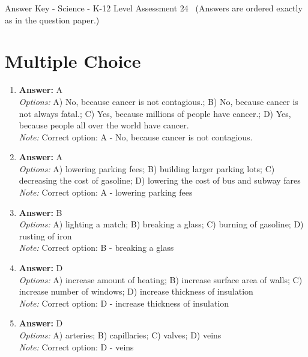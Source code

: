 \documentclass[12pt]{article}
\begin{document}
\begin{center}
Answer Key - Science - K-12 Level Assessment 24 \
\small (Answers are ordered exactly as in the question paper.)
\end{center}

\section*{Multiple Choice}
\begin{enumerate}[label=\arabic*.]
\item \textbf{Answer:} A
\\ \textit{Options:} A) No, because cancer is not contagious.; B) No, because cancer is not always fatal.; C) Yes, because millions of people have cancer.; D) Yes, because people all over the world have cancer.
\\ \textit{Note:} Correct option: A - No, because cancer is not contagious.
\item \textbf{Answer:} A
\\ \textit{Options:} A) lowering parking fees; B) building larger parking lots; C) decreasing the cost of gasoline; D) lowering the cost of bus and subway fares
\\ \textit{Note:} Correct option: A - lowering parking fees
\item \textbf{Answer:} B
\\ \textit{Options:} A) lighting a match; B) breaking a glass; C) burning of gasoline; D) rusting of iron
\\ \textit{Note:} Correct option: B - breaking a glass
\item \textbf{Answer:} D
\\ \textit{Options:} A) increase amount of heating; B) increase surface area of walls; C) increase number of windows; D) increase thickness of insulation
\\ \textit{Note:} Correct option: D - increase thickness of insulation
\item \textbf{Answer:} D
\\ \textit{Options:} A) arteries; B) capillaries; C) valves; D) veins
\\ \textit{Note:} Correct option: D - veins
\end{enumerate}
\end{document}
